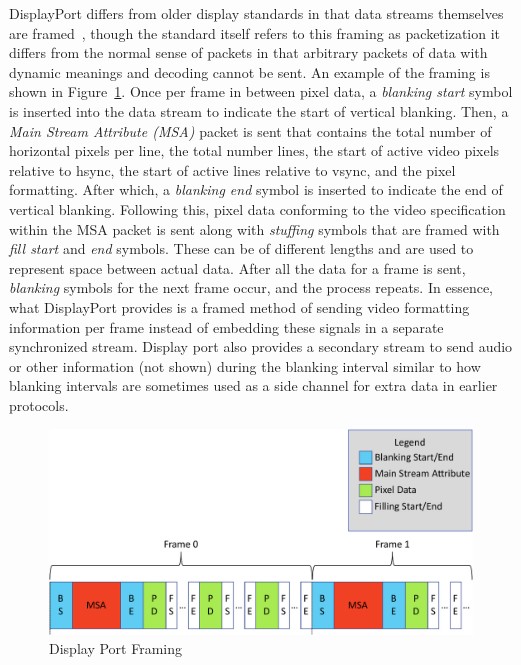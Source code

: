     DisplayPort differs from older display standards in that data streams themselves are framed~\cite{VESA2011,Wiley2011}, though the standard itself refers to this framing as packetization it differs from the normal sense of packets in that arbitrary packets of data with dynamic meanings and decoding cannot be sent. An example of the framing is shown in Figure~\ref{fig:display_port_framing}. Once per frame in between pixel data, a {\it blanking start} symbol is inserted into the data stream to indicate the start of vertical blanking. Then, a {\it Main Stream Attribute (MSA)} packet is sent that contains the total number of horizontal pixels per line, the total number lines, the start of active video pixels relative to hsync, the start of active lines relative to vsync, and the pixel formatting. After which, a {\it blanking end} symbol is inserted to indicate the end of vertical blanking. Following this, pixel data conforming to the video specification within the MSA packet is sent along with {\it stuffing} symbols that are framed with {\it fill start} and {\it end} symbols. These can be of different lengths and are used to represent space between actual data. After all the data for a frame is sent, {\it blanking} symbols for the next frame occur, and the process repeats. In essence, what DisplayPort provides is a framed method of sending video formatting information per frame instead of embedding these signals in a separate synchronized stream. Display port also provides a secondary stream to send audio or other information (not shown) during the blanking interval similar to how blanking intervals are sometimes used as a side channel for extra data in earlier protocols.

    \begin{figure}
        \centering
        \includegraphics[width=1.0\textwidth]{fig/display_port_framing.pdf}
        \caption{Display Port Framing}
        \label{fig:display_port_framing}
    \end{figure}

